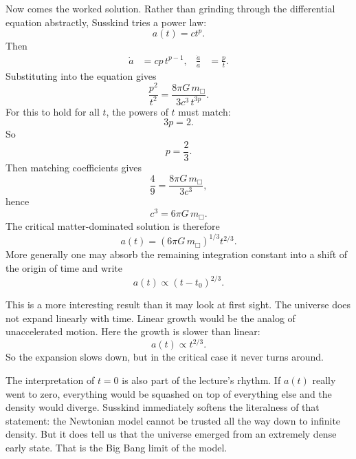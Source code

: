 Now comes the worked solution. Rather than grinding through the differential equation abstractly, Susskind tries a power law:
\begin{equation}
a(t)=ct^p.
\end{equation}
Then
\begin{align}
\dot a &= cp\,t^{p-1}, &
\frac{\dot a}{a} &= \frac{p}{t}.
\end{align}
Substituting into the equation gives
\begin{equation}
\frac{p^2}{t^2}=\frac{8\pi G\,m_{\Box}}{3c^3\,t^{3p}}.
\end{equation}
For this to hold for all \(t\), the powers of \(t\) must match:
\begin{equation}
3p=2.
\end{equation}
So
\begin{equation}
p=\frac{2}{3}.
\end{equation}
Then matching coefficients gives
\begin{equation}
\frac{4}{9}=\frac{8\pi G\,m_{\Box}}{3c^3},
\end{equation}
hence
\begin{equation}
c^3=6\pi G\,m_{\Box}.
\end{equation}
The critical matter-dominated solution is therefore
\begin{equation}
a(t)=\left(6\pi G\,m_{\Box}\right)^{1/3}t^{2/3}.
\end{equation}
More generally one may absorb the remaining integration constant into a shift of the origin of time and write
\begin{equation}
a(t)\propto (t-t_0)^{2/3}.
\end{equation}

This is a more interesting result than it may look at first sight. The universe does not expand linearly with time. Linear growth would be the analog of unaccelerated motion. Here the growth is slower than linear:
\begin{equation}
a(t)\propto t^{2/3}.
\end{equation}
So the expansion slows down, but in the critical case it never turns around.

The interpretation of \(t=0\) is also part of the lecture's rhythm. If \(a(t)\) really went to zero, everything would be squashed on top of everything else and the density would diverge. Susskind immediately softens the literalness of that statement: the Newtonian model cannot be trusted all the way down to infinite density. But it does tell us that the universe emerged from an extremely dense early state. That is the Big Bang limit of the model.

